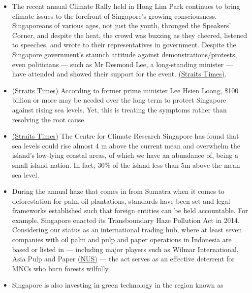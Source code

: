\documentclass[oneside]{book}
\begin{document}
\begin{enumerate}
\begin{itemize}
\begin{itemize}
            \item The recent annual Climate Rally held in Hong Lim Park continues to bring climate issues to the forefront of Singapore's growing consciousness. Singaporeans of various ages, not just the youth, thronged the Speakers' Corner, and despite the heat, the crowd was buzzing as they cheered, listened to speeches, and wrote to their representatives in government. Despite the Singapore government's staunch attitude against demonstrations/protests, even politicians --- such as Mr Desmond Lee, a long-standing minister --- have attended and showed their support for the event. \href{https://www.straitstimes.com/singapore/environment/hundreds-turn-up-in-red-at-hong-lim-park-for-first-singapore-climate-rally}{(Straits Times)}.
            \item \href{https://www.straitstimes.com/singapore/national-day-rally-2019-100-billion-needed-to-protect-singapore-against-rising-sea-levels}{(Straits Times)} According to former prime minister Lee Hsien Loong, \$100 billion or more may be needed over the long term to protect Singapore against rising sea levels. Yet, this is treating the symptoms rather than resolving the root cause.
            \item \href{https://www.straitstimes.com/singapore/national-day-rally-2019-100-billion-needed-to-protect-singapore-against-rising-sea-levels}{(Straits Times)} The Centre for Climate Research Singapore has found that sea levels could rise almost 4 m above the current mean and overwhelm the island's low-lying coastal areas, of which we have an abundance of, being a small island nation. In fact, 30\% of the island less than 5m above the mean sea level.
            \item During the annual haze that comes
            in from Sumatra when it comes to deforestation for palm oil plantations, standards have been set and legal frameworks established such that foreign entities can be held accountable. For example, Singapore enacted its Transboundary Haze Pollution Act in 2014. Considering our status as an international trading hub, where at least seven companies with oil palm and pulp and paper operations in Indonesia are based or listed in --- including major players such as Wilmar International, Asia Pulp and Paper \href{https://law.nus.edu.sg/wp-content/uploads/2020/04/002_2015_Alan-Khee-Jin-Tan.pdf}{(NUS)} --- the act serves as an effective deterrent for MNCs who burn forests wilfully.
            \item Singapore is also investing in green technology in the region known as

\end{itemize}
\end{itemize}
\end{enumerate}
\end{document}
